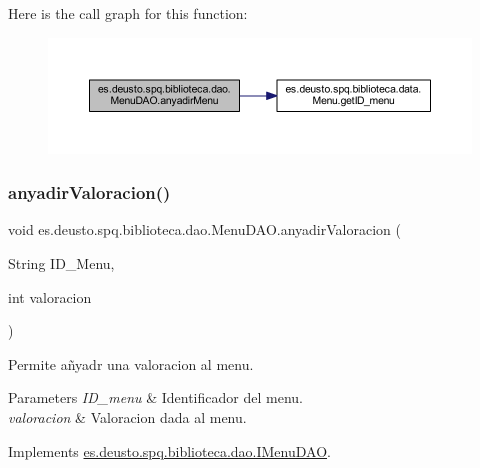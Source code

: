 Here is the call graph for this function\+:
\nopagebreak
\begin{figure}[H]
\begin{center}
\leavevmode
\includegraphics[width=350pt]{classes_1_1deusto_1_1spq_1_1biblioteca_1_1dao_1_1_menu_d_a_o_af7d7568033bc78af220f0fd5cf4a71b6_cgraph}
\end{center}
\end{figure}
\mbox{\label{classes_1_1deusto_1_1spq_1_1biblioteca_1_1dao_1_1_menu_d_a_o_abdc102f8901cbab970e2791adf5865b9}} 
\subsubsection{\texorpdfstring{anyadir\+Valoracion()}{anyadirValoracion()}}
{\footnotesize\ttfamily void es.\+deusto.\+spq.\+biblioteca.\+dao.\+Menu\+D\+A\+O.\+anyadir\+Valoracion (\begin{DoxyParamCaption}\item[{String}]{I\+D\+\_\+\+Menu,  }\item[{int}]{valoracion }\end{DoxyParamCaption})}

Permite añyadr una valoracion al menu. 
\begin{DoxyParams}{Parameters}
{\em I\+D\+\_\+menu} & Identificador del menu. \\
\hline
{\em valoracion} & Valoracion dada al menu. \\
\hline
\end{DoxyParams}


Implements \mbox{\hyperlink{interfacees_1_1deusto_1_1spq_1_1biblioteca_1_1dao_1_1_i_menu_d_a_o_abd65ad2c5269cd19edc975518bf16b49}{es.\+deusto.\+spq.\+biblioteca.\+dao.\+I\+Menu\+D\+AO}}.



